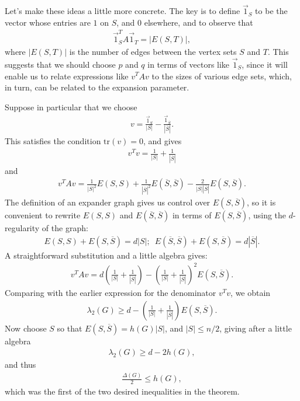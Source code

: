 \documentclass[12pt]{article}
\begin{document}
Let's make these ideas a little more concrete.  The key is to define
$\vec 1_S$ to be the vector whose entries are $1$ on $S$, and $0$
elsewhere, and to observe that
\begin{eqnarray}
  \vec 1_S^T A \vec 1_T = |E(S,T)|,
\end{eqnarray}
where $|E(S,T)|$ is the number of edges between the vertex sets $S$
and $T$.  This suggests that we should choose $p$ and $q$ in terms of
vectors like $\vec 1_S$, since it will enable us to relate expressions
like $v^T A v$ to the sizes of various edge sets, which, in turn, can
be related to the expansion parameter.

Suppose in particular that we choose
\begin{eqnarray}
  v = \frac{\vec 1_S}{|S|}-\frac{\vec 1_{\overline S}}{|\overline S|}.
\end{eqnarray}
This satisfies the condition $\mbox{tr}(v) = 0$, and gives
\begin{eqnarray}
  v^T v = \frac{1}{|S|}+\frac{1}{|\overline S|}
\end{eqnarray}
and
\begin{eqnarray}
  v^T A v = \frac{1}{|S|^2} E(S,S) + \frac{1}{|\overline S|^2}
E(\overline S,\overline S) - \frac{2}{|S||\overline S|} E(S,\overline S).
\end{eqnarray}
The definition of an expander graph gives us control over
$E(S,\overline S)$, so it is convenient to rewrite $E(S,S)$ and
$E(\overline S,\overline S)$ in terms of $E(S,\overline S)$, using the
$d$-regularity of the graph:
\begin{eqnarray}
  E(S,S)+E(S,\overline S) = d |S|; \,\,\, E(\overline S,\overline S)+
E(S,\overline S) = d |\overline S|.
\end{eqnarray}
A straightforward substitution and a little algebra gives:
\begin{eqnarray}
  v^T A v = d \left( \frac{1}{|S|}+\frac{1}{|\overline S|} \right)
  - \left(\frac{1}{|S|}+\frac{1}{|\overline S|}\right)^2 E(S,\overline S).
\end{eqnarray}
Comparing with the earlier expression for the denominator $v^T v$, we
obtain
\begin{eqnarray}
  \lambda_2(G) \geq d-\left(\frac{1}{|S|}+\frac{1}{|\overline S|}\right)
  E(S,\overline S).
\end{eqnarray}
Now choose $S$ so that $E(S,\overline S) = h(G) |S|$, and $|S| \leq
n/2$, giving after a little algebra
\begin{eqnarray}
  \lambda_2(G) \geq d-2 h(G),
\end{eqnarray}
and thus
\begin{eqnarray}
  \frac{\Delta(G)}{2} \leq h(G),
\end{eqnarray}
which was the first of the two desired inequalities in the theorem.
\end{document}
